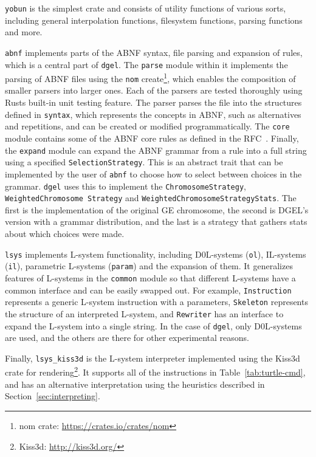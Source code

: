\texttt{yobun} is the simplest crate and consists of utility functions of various sorts, including general interpolation functions, filesystem functions, parsing functions and more.

\texttt{abnf} implements parts of the ABNF syntax, file parsing and expansion of rules, which is a central part of \texttt{dgel}.
The \texttt{parse} module within it implements the parsing of ABNF files using the \texttt{nom} create\footnote{nom crate: \url{https://crates.io/crates/nom}}, which enables the composition of smaller parsers into larger ones.
Each of the parsers are tested thoroughly using Rusts built-in unit testing feature.
The parser parses the file into the structures defined in \texttt{syntax}, which represents the concepts in ABNF, such as alternatives and repetitions, and can be created or modified programmatically.
The \texttt{core} module contains some of the ABNF core rules as defined in the RFC~\cite{RFC5234}.
Finally, the \texttt{expand} module can expand the ABNF grammar from a rule into a full string using a specified \texttt{SelectionStrategy}.
This is an abstract trait that can be implemented by the user of \texttt{abnf} to choose how to select between choices in the grammar.
\texttt{dgel} uses this to implement the \texttt{ChromosomeStrategy}, \texttt{WeightedChromosome Strategy} and \texttt{WeightedChromosomeStrategyStats}.
The first is the implementation of the original \gls{GE} chromosome, the second is \gls{DGEL}'s version with a grammar distribution, and the last is a strategy that gathers stats about which choices were made.

\texttt{lsys} implements \gls{L-system} functionality, including D0L-systems (\texttt{ol}), IL-systems (\texttt{il}), parametric \glspl{L-system} (\texttt{param}) and the expansion of them.
It generalizes features of \glspl{L-system} in the \texttt{common} module so that different \glspl{L-system} have a common interface and can be easily swapped out.
For example, \texttt{Instruction} represents a generic \gls{L-system} instruction with a parameters, \texttt{Skeleton} represents the structure of an interpreted \gls{L-system}, and \texttt{Rewriter} has an interface to expand the \gls{L-system} into a single string.
In the case of \texttt{dgel}, only D0L-systems are used, and the others are there for other experimental reasons.

Finally, \texttt{lsys\_kiss3d} is the \gls{L-system} interpreter implemented using the Kiss3d crate for rendering\footnote{Kiss3d: \url{http://kiss3d.org/}}.
It supports all of the instructions in Table~\ref{tab:turtle-cmd}, and has an alternative interpretation using the heuristics described in Section~\ref{sec:interpreting}.

